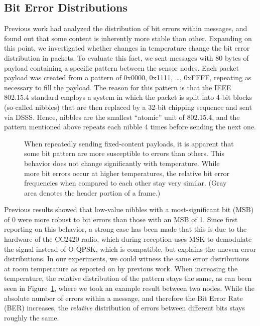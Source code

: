 \documentclass[color]{aib}
\begin{document}
\subsection{Bit Error Distributions}
\label{sec:biterrors}

Previous work\cite{senserr} had analyzed the distribution of bit errors within messages, and found out that some content is inherently more stable than other.
Expanding on this point, we investigated whether changes in temperature change the bit error distribution in packets.
To evaluate this fact, we sent messages with 80 bytes of payload containing a specific pattern between the sensor nodes. Each packet payload was created from a pattern of 0x0000, 0x1111, \dots, 0xFFFF, repeating as necessary to fill the payload.
The reason for this pattern is that the IEEE 802.15.4 standard employs a system in which the packet is split into 4-bit blocks (so-called nibbles) that are then replaced by a 32-bit chipping sequence and sent via DSSS.
Hence, nibbles are the smallest ``atomic'' unit of 802.15.4, and the pattern mentioned above repeats each nibble 4 times before sending the next one.

\begin{figure}[tb]
\centering 
{}
\hfill 
{}
\vspace{-6pt}
\caption{When repeatedly sending fixed-content payloads, it is apparent that some bit pattern are more susceptible to errors than others. This behavior does not change significantly with temperature. While more bit errors occur at higher temperatures, the relative bit error frequencies when compared to each other stay very similar. (Gray area denotes the header portion of a frame.)}
\vspace{-6pt}
\label{fig:biterrortemp}
\end{figure}

Previous results\cite{senserr} showed that low-value nibbles with a most-significant bit (MSB) of 0 were more robust to bit errors than those with an MSB of 1.
Since first reporting on this behavior, a strong case has been made\cite{hermans14ewsn} that this is due to the hardware of the CC2420 radio, which during reception uses MSK to demodulate the signal instead of O-QPSK, which is compatible, but explains the uneven error distributions.
In our experiments, we could witness the same error distributions at room temperature as reported on by previous work.
When increasing the temperature, the relative distribution of the pattern stays the same, as can been seen in Figure~\ref{fig:biterrortemp}, where we took an example result between two nodes.
While the absolute number of errors within a message, and therefore the Bit Error Rate (BER) increases, the \textit{relative} distribution of errors between different bits stays roughly the same.
\end{document}
